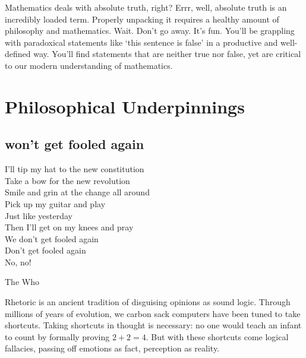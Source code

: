 \documentclass{scrbook}
\begin{document}
Mathematics deals with absolute truth, right? Errr, well, absolute truth is an incredibly loaded term. Properly unpacking it requires a healthy amount of philosophy and mathematics. Wait. Don't go away. It's fun. You'll be grappling with paradoxical statements like `this sentence is false' in a productive and well-defined way. You'll find statements that are neither true nor false, yet are critical to our modern understanding of mathematics. 

\chapter{Philosophical Underpinnings}
\section[Won't get Fooled Again]{won't get fooled again}
\epigraph{I'll tip my hat to the new constitution \\
Take a bow for the new revolution \\
Smile and grin at the change all around \\
Pick up my guitar and play \\
Just like yesterday \\
Then I'll get on my knees and pray \\
We don't get fooled again \\
Don't get fooled again \\
No, no!}{The Who}

Rhetoric is an ancient tradition of disguising opinions as sound logic. Through millions of years of evolution, we carbon sack computers have been tuned to take shortcuts. Taking shortcuts in thought is necessary: no one would teach an infant to count by formally proving $2+2=4$. But with these shortcuts come logical fallacies, passing off emotions as fact, perception as reality.
\end{document}
